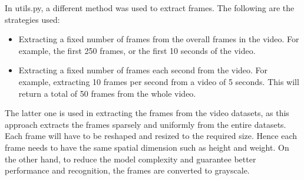 In utils.py, a different method was used to extract frames. The following are the strategies used:
\begin{itemize}
\item Extracting a fixed number of frames from the overall frames in the video. For example, the first 250 frames, or the first 10 seconds of the video.
\item Extracting a fixed number of frames each second from the video. For example, extracting 10 frames per second from a video of 5 seconds. This will return a total of 50 frames from the whole video.
\end{itemize}
\hspace{5mm} The latter one is used in extracting the frames from the video datasets, as this approach extracts the frames sparsely and uniformly from the entire datasets.
Each frame will have to be reshaped and resized to the required size. Hence each frame needs to have the same spatial dimension such as height and weight. On the other hand, to reduce the model complexity and guarantee better performance and recognition, the frames are converted to grayscale.\\

